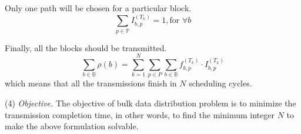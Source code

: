 \begin{packeditemize}
\item Only one path will be chosen for a particular block.
\begin{equation}
\displaystyle{\sum_{p \in \mathbb{P}}} I^{(T_k)}_{b,p} = 1, \text{for }\forall b
\end{equation}

\item Finally, all the blocks should be transmitted.
\begin{equation}
\displaystyle{\sum_{b\in \mathbb{B}}} \rho(b) = \displaystyle{\sum_{k=1}^{N}} \displaystyle{\sum_{p\in P}} \displaystyle{\sum_{b\in \mathbb{B}}} f_{b,p}^{(T_k)} \cdot I_{b,p}^{(T_k)}
\end{equation}
which means that all the transmissions finish in $N$ scheduling cycles.
\end{packeditemize}


\noindent(4) {\em Objective.} The objective of bulk data distribution problem is to minimize the transmission completion time, in other words, to find the minimum integer $N$ to make the above formulation solvable.




